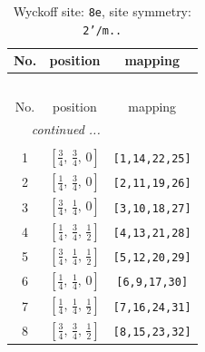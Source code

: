 \documentclass[fleqn,8pt]{jsarticle}
\begin{document}
\renewcommand{\arraystretch}{1.2}
\begin{longtable}{ccc}
\caption{Wyckoff site: {\tt 8e}, site symmetry: {\tt 2'/m..}}
 \\
 \hline \hline
No. & position & mapping \\ \hline \endfirsthead

\multicolumn{2}{l}{\tablename\ \thetable{}} \\
 \hline \hline
No. & position & mapping \\ \hline \endhead

 \hline \hline
\multicolumn{2}{r}{\footnotesize\it continued ...} \\ \endfoot

 \hline \hline
\multicolumn{2}{r}{} \\ \endlastfoot

1 & $\left[ \frac{3}{4},\, \frac{3}{4},\, 0 \right]$ & {\tt [1,14,22,25]} \\ \hline
2 & $\left[ \frac{1}{4},\, \frac{3}{4},\, 0 \right]$ & {\tt [2,11,19,26]} \\ \hline
3 & $\left[ \frac{3}{4},\, \frac{1}{4},\, 0 \right]$ & {\tt [3,10,18,27]} \\ \hline
4 & $\left[ \frac{1}{4},\, \frac{3}{4},\, \frac{1}{2} \right]$ & {\tt [4,13,21,28]} \\ \hline
5 & $\left[ \frac{3}{4},\, \frac{1}{4},\, \frac{1}{2} \right]$ & {\tt [5,12,20,29]} \\ \hline
6 & $\left[ \frac{1}{4},\, \frac{1}{4},\, 0 \right]$ & {\tt [6,9,17,30]} \\ \hline
7 & $\left[ \frac{1}{4},\, \frac{1}{4},\, \frac{1}{2} \right]$ & {\tt [7,16,24,31]} \\ \hline
8 & $\left[ \frac{3}{4},\, \frac{3}{4},\, \frac{1}{2} \right]$ & {\tt [8,15,23,32]} \\
\end{longtable}
\renewcommand{\arraystretch}{1.2}
\end{document}
